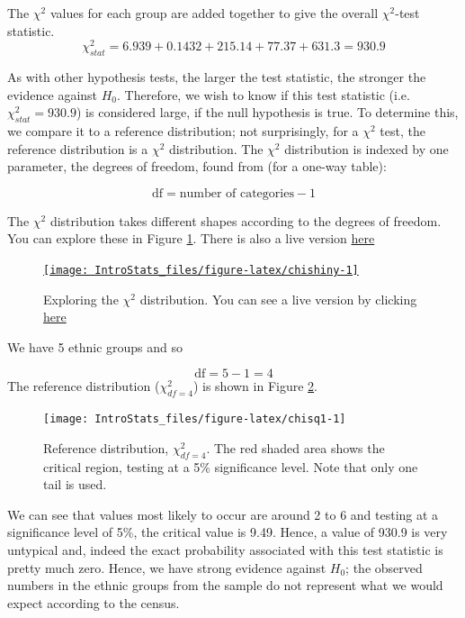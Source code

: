 \documentclass[
  oneside]{krantz}
\begin{document}
The \(\chi^2\) values for each group are added together to give the overall \(\chi^2\)-test statistic.
\[\chi_{stat}^2 = 6.939 + 0.1432 + 215.14 + 77.37 + 631.3 = 930.9\]

As with other hypothesis tests, the larger the test statistic, the stronger the evidence against \(H_0\). Therefore, we wish to know if this test statistic (i.e.~\(\chi_{stat}^2 = 930.9\)) is considered large, if the null hypothesis is true. To determine this, we compare it to a reference distribution; not surprisingly, for a \(\chi^2\) test, the reference distribution is a \(\chi^2\) distribution. The \(\chi^2\) distribution is indexed by one parameter, the degrees of freedom, found from (for a one-way table):

\[\textrm{df} = \textrm{number of categories} - 1 \]

The \(\chi^2\) distribution takes different shapes according to the degrees of freedom. You can explore these in Figure \ref{fig:chishiny}. There is also a live version \href{https://moniquemackenzie.shinyapps.io/IntroStats_ChiSq/}{here}



\begin{figure}

{\centering \href{https://moniquemackenzie.shinyapps.io/IntroStats_ChiSq/}{\texttt{[image: IntroStats\_files/figure-latex/chishiny-1]} }

}

\caption{Exploring the \(\chi^2\) distribution. You can see a live version by clicking \href{https://moniquemackenzie.shinyapps.io/IntroStats_ChiSq/}{here}}\label{fig:chishiny}
\end{figure}

We have 5 ethnic groups and so

\[\textrm{df} = 5 - 1 = 4\]
The reference distribution (\(\chi^2_{df=4}\)) is shown in Figure \ref{fig:chisq1}.



\begin{figure}

{\centering \texttt{[image: IntroStats\_files/figure-latex/chisq1-1]} 

}

\caption{Reference distribution, \(\chi^2_{df=4}\). The red shaded area shows the critical region, testing at a 5\% significance level. Note that only one tail is used.}\label{fig:chisq1}
\end{figure}

We can see that values most likely to occur are around 2 to 6 and testing at a significance level of 5\%, the critical value is 9.49. Hence, a value of 930.9 is very untypical and, indeed the exact probability associated with this test statistic is pretty much zero. Hence, we have strong evidence against \(H_0\); the observed numbers in the ethnic groups from the sample do not represent what we would expect according to the census.
\end{document}
